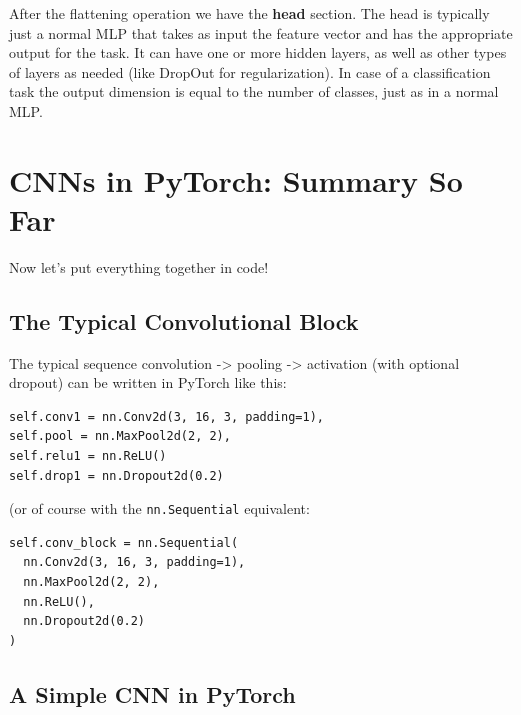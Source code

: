 After the flattening operation we have the \textbf{head} section. The head is typically just a normal MLP that takes as input the feature vector and has the appropriate output for the task. It can have one or more hidden layers, as well as other types of layers as needed (like DropOut for regularization). In case of a classification task the output dimension is equal to the number of classes, just as in a normal MLP.


\section{CNNs in PyTorch: Summary So Far}

Now let's put everything together in code!

\subsection{The Typical Convolutional Block}

The typical sequence convolution -> pooling -> activation (with optional dropout) can be written in PyTorch like this:

\begin{lstlisting}
self.conv1 = nn.Conv2d(3, 16, 3, padding=1),
self.pool = nn.MaxPool2d(2, 2),
self.relu1 = nn.ReLU()
self.drop1 = nn.Dropout2d(0.2)
\end{lstlisting}
(or of course with the \lstinline{nn.Sequential} equivalent:
\begin{lstlisting}
self.conv_block = nn.Sequential(
  nn.Conv2d(3, 16, 3, padding=1),
  nn.MaxPool2d(2, 2),
  nn.ReLU(),
  nn.Dropout2d(0.2)
)
\end{lstlisting}
\subsection{A Simple CNN in PyTorch}

